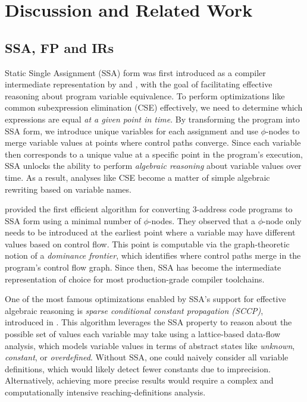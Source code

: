 \documentclass[acmsmall,screen,review]{acmart}
\begin{document}
\section{Discussion and Related Work}

\subsection{SSA, FP and IRs}

Static Single Assignment (SSA) form was first introduced as a compiler intermediate representation
by \citet{alpern-ssa-original-88} and \citet{rosen-gvn-1988}, with the goal of facilitating
effective reasoning about program variable equivalence. To perform optimizations like common
subexpression elimination (CSE) effectively, we need to determine which expressions are equal
\emph{at a given point in time}. By transforming the program into SSA form, we introduce unique
variables for each assignment and use $\phi$-nodes to merge variable values at points where control
paths converge. Since each variable then corresponds to a unique value at a specific point in the
program's execution, SSA unlocks the ability to perform \emph{algebraic reasoning} about variable
values over time. As a result, analyses like CSE become a matter of simple algebraic rewriting based
on variable names.

\citet{cytron-ssa-intro-91} provided the first efficient algorithm for converting 3-address code
programs to SSA form using a minimal number of $\phi$-nodes. They observed that a $\phi$-node only
needs to be introduced at the earliest point where a variable may have different values based on
control flow. This point is computable via the graph-theoretic notion of a \emph{dominance
frontier}, which identifies where control paths merge in the program's control flow graph. Since
then, SSA has become the intermediate representation of choice for most production-grade
compiler toolchains.

One of the most famous optimizations enabled by SSA's support for effective algebraic reasoning is
\emph{sparse conditional constant propagation (SCCP)}, introduced in \citet{wegman-sccp-91}. This
algorithm leverages the SSA property to reason about the possible set of values each variable may
take using a lattice-based data-flow analysis, which models variable values in terms of abstract
states like \emph{unknown}, \emph{constant}, or \emph{overdefined}. Without SSA, one could naively
consider all variable definitions, which would likely detect fewer constants due to imprecision.
Alternatively, achieving more precise results would require a complex and computationally intensive
reaching-definitions analysis.
\end{document}
